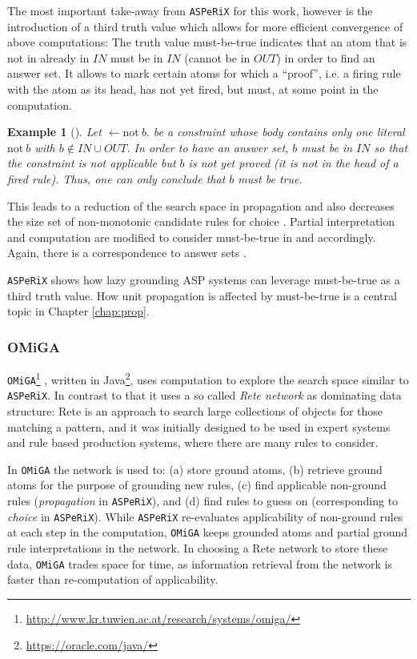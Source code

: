 \documentclass[final]{vutinfth} %
\newtheorem{example}{Example}[chapter]
\newcommand{\mbt}{must-be-true\xspace}
\newcommand{\fail}{\mathrm{not } \ \xspace}
\newcommand{\from}{\ensuremath{\leftarrow}}
\newcommand{\asperix}{\texttt{ASPeRiX}\xspace}
\newcommand{\omiga}{\texttt{OMiGA}\xspace}
\begin{document}
The most important take-away from \asperix for this work, however is the introduction of a third truth value which allows for more efficient convergence of above computations: The truth value \mbt indicates that an atom that is not in already in $IN$ must be in $IN$ (cannot be in $OUT$) in order to find an answer set. It allows to mark certain atoms for which a \enquote{proof}, i.e. a firing rule with the atom as its head, has not yet fired, but must, at some point in the computation.

\begin{example}[{\cite[Example 7]{asperix}}]
\label{ex:mbt}
Let $\from \fail b.$ be a constraint whose body contains only one literal $\fail b$ with $b \not \in IN \cup OUT$. In order to have an answer set, $b$ must be in $IN$ so that the constraint is not applicable but $b$ is not yet proved (it is not in the head of a fired rule). Thus, one can only conclude that $b$ must be true.
\end{example}

This leads to a reduction of the search space in propagation \cite[Ex.~8]{asperix} and also decreases the size set of non-monotonic candidate rules for choice \cite[Ex.~9]{asperix}. Partial interpretation and computation are modified to consider \mbt in \cite[Def.~8]{asperix} and \cite[Def.~11]{asperix} accordingly. Again, there is a correspondence to answer sets \cite[Thm.~3]{asperix}.

\asperix shows how lazy grounding ASP systems can leverage \mbt as a third truth value. How unit propagation is affected by \mbt is a central topic in Chapter \ref{chap:prop}.

\subsubsection{OMiGA}
\label{sec:omiga}

\omiga\footnote{\url{http://www.kr.tuwien.ac.at/research/systems/omiga/}} \cite{omiga}, written in Java\footnote{\url{https://oracle.com/java/}}, uses computation to explore the search space similar to \asperix. In contrast to that it uses a so called \emph{Rete network} \cite{rete} as dominating data structure: Rete is an approach to search large collections of objects for those matching a pattern, and it was initially designed to be used in expert systems and rule based production systems, where there are many rules to consider.

In \omiga the network is used to: (a) store ground atoms, (b) retrieve ground atoms for the purpose of grounding new rules, (c) find applicable non-ground rules (\emph{propagation} in \asperix), and (d) find rules to guess on (corresponding to \emph{choice} in \asperix). While \asperix re-evaluates applicability of non-ground rules at each step in the computation, \omiga keeps grounded atoms and partial ground rule interpretations in the network. In choosing a Rete network to store these data, \omiga trades space for time, as information retrieval from the network is faster than re-computation of applicability. 
\end{document}
